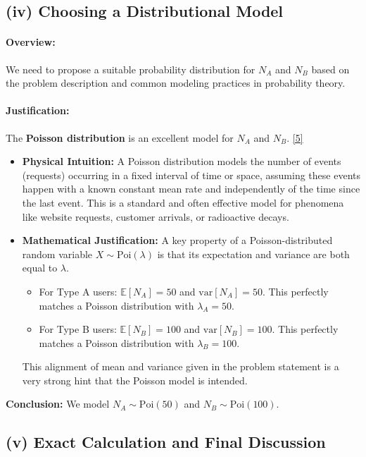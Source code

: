 \documentclass[11pt,a4paper]{article}
\begin{document}
\subsection{(iv) Choosing a Distributional Model}

\paragraph{Overview:}
We need to propose a suitable probability distribution for $N_A$ and $N_B$ based on the problem description and common modeling practices in probability theory.

\paragraph{Justification:}
The \textbf{Poisson distribution} is an excellent model for $N_A$ and $N_B$.
\hyperlink{concept5}{[5]}
\begin{itemize}
    \item \textbf{Physical Intuition:} A Poisson distribution models the number of events (requests) occurring in a fixed interval of time or space, assuming these events happen with a known constant mean rate and independently of the time since the last event. This is a standard and often effective model for phenomena like website requests, customer arrivals, or radioactive decays.
    \item \textbf{Mathematical Justification:} A key property of a Poisson-distributed random variable $X \sim \text{Poi}(\lambda)$ is that its expectation and variance are both equal to $\lambda$.
    \begin{itemize}
        \item For Type A users: $\mathbb{E}[N_A] = 50$ and $\text{var}[N_A] = 50$. This perfectly matches a Poisson distribution with $\lambda_A = 50$.
        \item For Type B users: $\mathbb{E}[N_B] = 100$ and $\text{var}[N_B] = 100$. This perfectly matches a Poisson distribution with $\lambda_B = 100$.
    \end{itemize}
    This alignment of mean and variance given in the problem statement is a very strong hint that the Poisson model is intended.
\end{itemize}
\textbf{Conclusion:} We model $N_A \sim \text{Poi}(50)$ and $N_B \sim \text{Poi}(100)$.

\subsection{(v) Exact Calculation and Final Discussion}
\end{document}
